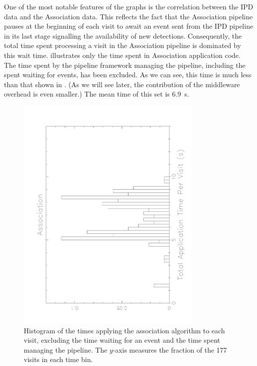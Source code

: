 One of the most notable features of the graphs is the correlation
between the IPD data and the Association data.  This reflects the fact
that the Association pipeline pauses at the beginning of each visit to
await an event sent from the IPD pipeline in its last stage signalling
the availability of new detections.  Consequently, the total time spent
processing a visit in the Association pipeline is dominated by this
wait time.   illustrates only the time spent in
Association application code.  The time spent by the pipeline
framework managing the pipeline, including the spent waiting for
events, has been excluded.  As we can see, this time is much less than
that shown in .  (As we will see later, the contribution of
the middleware overhead is even smaller.)  The mean time of this set
is 6.9~s.  

\begin{figure}[htbp]
\begin{center}
\includegraphics[width=0.8\textwidth,angle=-90,scale=0.45,viewport=47 49 587 719,clip]{figures/AppLoopHistAssoc.pdf}
\end{center}
\caption{Histogram of the times applying the association algorithm to
  each visit, excluding the time waiting for an event and the time
  spent managing the pipeline.  The $y$-axis measures the fraction of 
  the 177 visits in each time bin.\label{f6-5}} 
\end{figure}

